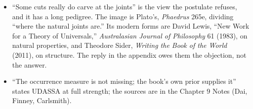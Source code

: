 \begin{itemize}
\setlength{\itemsep}{0.5em}
\item ``Some cuts really do carve at the joints'' is the view the postulate refuses, and it has a long pedigree. The image is Plato's, \textit{Phaedrus} 265e, dividing ``where the natural joints are.'' Its modern forms are David Lewis, ``New Work for a Theory of Universals,'' \textit{Australasian Journal of Philosophy} 61 (1983), on natural properties, and Theodore Sider, \textit{Writing the Book of the World} (2011), on structure. The reply in the appendix owes them the objection, not the answer.
\item ``The occurrence measure is not missing; the book's own prior supplies it'' states UDASSA at full strength; the sources are in the Chapter 9 Notes (Dai, Finney, Carlsmith).
\end{itemize}

